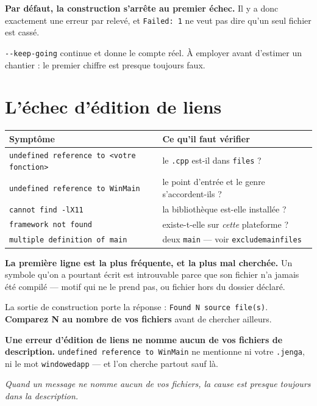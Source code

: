 \begin{nkretenir}
\textbf{Par défaut, la construction s'arrête au premier échec.} Il y a donc
exactement une erreur par relevé, et \texttt{Failed: 1} ne veut pas dire qu'un
seul fichier est cassé.

\texttt{-{}-keep-going} continue et donne le compte réel. À employer avant
d'estimer un chantier : le premier chiffre est presque toujours faux.
\end{nkretenir}

\section{L'échec d'édition de liens}

\begin{center}
\begin{tabular}{@{}ll@{}}
\toprule
\textbf{Symptôme} & \textbf{Ce qu'il faut vérifier} \\
\midrule
\texttt{undefined reference to <votre fonction>} & le \texttt{.cpp} est-il dans \texttt{files} ? \\
\texttt{undefined reference to WinMain} & le point d'entrée et le genre s'accordent-ils ? \\
\texttt{cannot find -lX11} & la bibliothèque est-elle installée ? \\
\texttt{framework not found} & existe-t-elle sur \emph{cette} plateforme ? \\
\texttt{multiple definition of main} & deux \texttt{main} --- voir \texttt{excludemainfiles} \\
\bottomrule
\end{tabular}
\end{center}

\begin{nkretenir}
\textbf{La première ligne est la plus fréquente, et la plus mal cherchée.} Un
symbole qu'on a pourtant écrit est introuvable parce que son fichier n'a jamais
été compilé --- motif qui ne le prend pas, ou fichier hors du dossier déclaré.

La sortie de construction porte la réponse : \texttt{Found N source file(s)}.
\textbf{Comparez N au nombre de vos fichiers} avant de chercher ailleurs.
\end{nkretenir}

\begin{nkpiege}
\textbf{Une erreur d'édition de liens ne nomme aucun de vos fichiers de
description.} \texttt{undefined reference to WinMain} ne mentionne ni votre
\texttt{.jenga}, ni le mot \texttt{windowedapp} --- et l'on cherche partout sauf
là.

\emph{Quand un message ne nomme aucun de vos fichiers, la cause est presque
toujours dans la description.}
\end{nkpiege}

